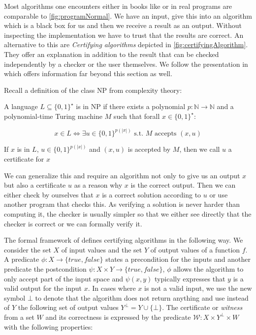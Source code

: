 Most algorithms one encounters either in books like \cite{AlgorithmsBook} or in real programs are comparable to \cref{fig:programNormal}. We have an input, give this into an algorithm which is a black box for us and then we receive a result as an output. Without inspecting the implementation we have to trust that the results are correct.
An alternative to this are \textit{Certifying algorithms} depicted in \cref{fig:certifyingAlgorithm}. They offer an explanation in addition to the result that can be checked independently by a checker or the user themselves. We follow the presentation in \cite{CertAlg} which offers information far beyond this section as well. 

Recall a definition of the class NP from complexity theory:

\begin{definition}
    A language $L \subseteq \{0,1\}^\star$ is in NP if there exists a polynomial $p: \mathbb{N} \to \mathbb{N}$ and a polynomial-time Turing machine $M$ such that forall $x \in \{0,1\}^\star$:

    \[ x \in L  \Leftrightarrow \exists u \in \{0,1\}^{p(|x|)}\text{ s.t. $M$ accepts $(x,u)$} \]

    If $x$ is in $L$, $u \in \{0,1\}^{p(|x|)}$ and $(x,u)$ is accepted by $M$, then we call $u$ a certificate for $x$
\end{definition}

We can generalize this and require an algorithm not only to give us an output $x$ but also a certificate $u$ as a reason why $x$ is the correct output. Then we can either check by ourselves that $x$ is a correct solution according to $u$ or use another program that checks this. As verifying a solution is never harder than computing it, the checker is usually simpler so that we either see directly that the checker is correct or we can formally verify it.

The formal framework of \cite{CertAlg} defines certifying algorithms in the following way. We consider the set $X$ of input values and the set $Y$ of output values of a function $f$. A predicate $\phi: X \to \{true, false\}$ states a precondition for the inputs and another predicate the postcondition $\psi: X \times Y \to \{true, false\}$, $\phi$ allows the algorithm to only accept part of the input space and $\psi(x,y)$ typically expresses that $y$ is a valid output for the input $x$. In cases where $x$ is not a valid input, we use the new symbol $\bot$ to denote that the algorithm does not return anything and use instead of $Y$ the following set of output values $Y^\bot = Y \cup \{\bot\}$.
The certificate or \textit{witness} from a set $W$ and its correctness is expressed by the predicate $\mathcal{W}: X \times Y^\bot \times W$ with the following properties:


